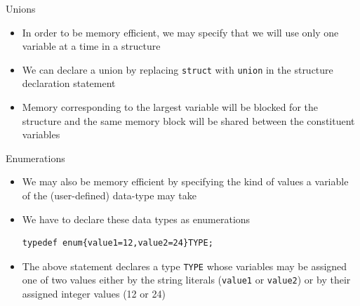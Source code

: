 \documentclass{beamer}
\begin{document}
\begin{frame}[fragile]{Unions}
\begin{itemize}
\item In order to be memory efficient, we may specify that we will use only one variable at a time in a structure
\item We can declare a union by replacing \verb|struct| with \verb|union| in the structure declaration statement
\item Memory corresponding to the largest variable will be blocked for the structure and the same memory block will be shared between the constituent variables
\end{itemize}
\end{frame}

\begin{frame}[fragile]{Enumerations}
\begin{itemize}
\item We may also be memory efficient by specifying the kind of values a variable of the (user-defined) data-type may take
\item We have to declare these data types as enumerations
\begin{verbatim}
typedef enum{value1=12,value2=24}TYPE;
\end{verbatim}
\item The above statement declares a type \verb|TYPE| whose variables may be assigned one of two values either by the string literals (\verb|value1| or \verb|value2|) or by their assigned integer values (12 or 24)
\end{itemize}
\end{frame}
\end{document}
